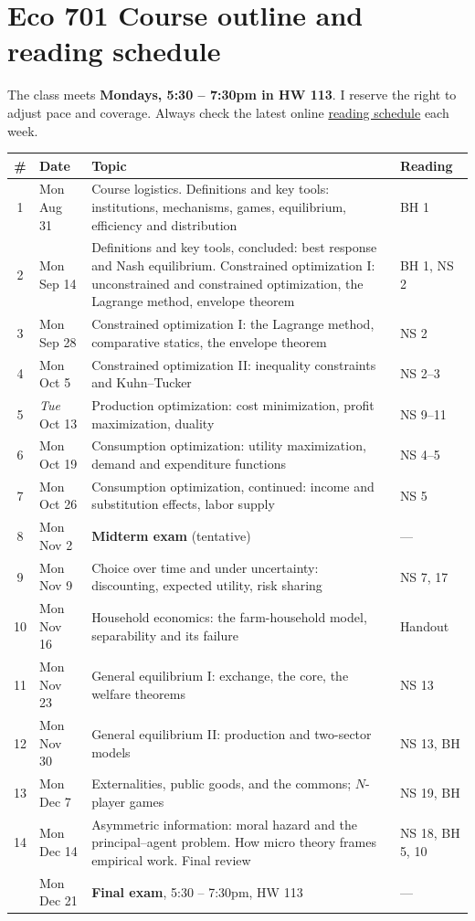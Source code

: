 \documentclass[11pt]{article}
\begin{document}
\newpage

\section{Eco 701 Course outline and reading schedule}
The class meets \textbf{Mondays, 5:30 -- 7:30pm in HW 113}. I reserve the right to adjust pace and coverage. Always check the latest
online \href{https://jhconning.github.io/hunter_eco701/schedule}{reading
schedule} each week.

\begin{center}
\begin{tabularx}{\textwidth}{@{}c l X l@{}}
\hline
\textbf{\#} & \textbf{Date} & \textbf{Topic} & \textbf{Reading}\\
\hline
1  & Mon Aug 31 & Course logistics. Definitions and key tools: institutions, mechanisms, games, equilibrium, efficiency and distribution & BH 1\\
2  & Mon Sep 14 & Definitions and key tools, concluded: best response and Nash equilibrium. Constrained optimization I: unconstrained and constrained optimization, the Lagrange method, envelope theorem & BH 1, NS 2\\
3  & Mon Sep 28 & Constrained optimization I: the Lagrange method, comparative statics, the envelope theorem & NS 2\\
4  & Mon Oct 5  & Constrained optimization II: inequality constraints and Kuhn--Tucker & NS 2--3\\
5  & \emph{Tue} Oct 13 & Production optimization: cost minimization, profit maximization, duality & NS 9--11\\
6  & Mon Oct 19 & Consumption optimization: utility maximization, demand and expenditure functions & NS 4--5\\
7  & Mon Oct 26 & Consumption optimization, continued: income and substitution effects, labor supply & NS 5\\
8  & Mon Nov 2  & \textbf{Midterm exam} (tentative) & ---\\
9  & Mon Nov 9  & Choice over time and under uncertainty: discounting, expected utility, risk sharing & NS 7, 17\\
10 & Mon Nov 16 & Household economics: the farm-household model, separability and its failure & Handout\\
11 & Mon Nov 23 & General equilibrium I: exchange, the core, the welfare theorems & NS 13\\
12 & Mon Nov 30 & General equilibrium II: production and two-sector models & NS 13, BH\\
13 & Mon Dec 7  & Externalities, public goods, and the commons; $N$-player games & NS 19, BH\\
14 & Mon Dec 14 & Asymmetric information: moral hazard and the principal--agent problem. How micro theory frames empirical work. Final review & NS 18, BH 5, 10\\
\hline
   & Mon Dec 21 & \textbf{Final exam}, 5:30 -- 7:30pm, HW 113 & ---\\

\hline
\end{tabularx}
\end{center}
\end{document}
